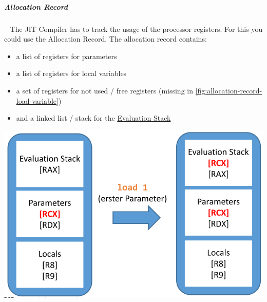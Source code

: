 \documentclass[11pt,twoside,landscape]{article}
\begin{document}
\begin{multicols}{3}
\subparagraph{Allocation Record} \
\label{sec:org109064e}
The JIT Compiler has to track the usage of the processor registers.
For this you could use the Allocation Record.
The allocation record contains:
\begin{itemize}
\item a list of registers for parameters
\item a list of registers for local variables
\item a set of registers for not used / free registers (missing in \autoref{fig:allocation-record-load-variable})
\item and a linked list / stack for the \href{../../../roam/20221230171752-what_is_a_evaluation_stack.org}{Evaluation Stack}
\end{itemize}


{
\begin{center}
\includegraphics[width=.9\linewidth]{img/allocation_record_load_var.png}
\end{center}
\label{fig:allocation-record-load-variable}
}

\end{multicols}
\end{document}
